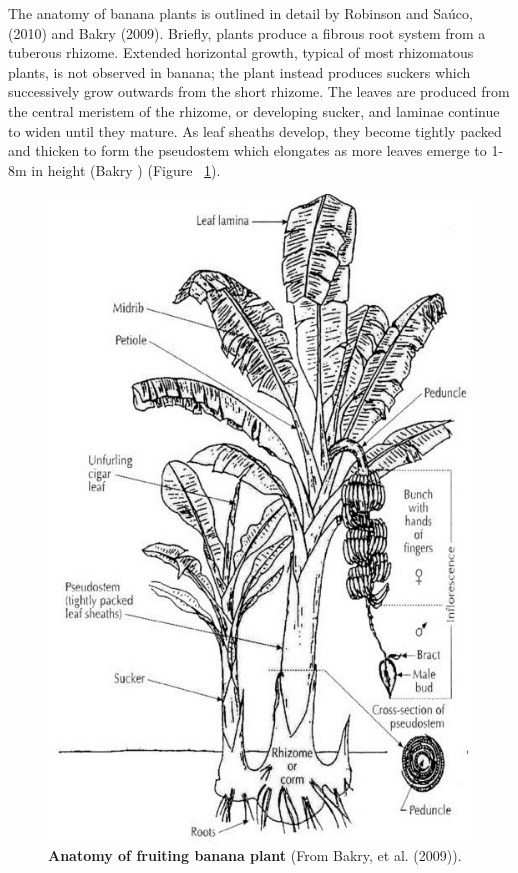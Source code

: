 The anatomy of banana plants is outlined in detail by Robinson and Saúco, (2010) and Bakry \et (2009). Briefly, plants produce a fibrous root system from a tuberous rhizome. Extended horizontal growth, typical of most rhizomatous plants, is not observed in banana; the plant instead produces suckers which successively grow outwards from the short rhizome. The leaves are produced from the central meristem of the rhizome, or developing sucker, and laminae continue to widen until they mature. As leaf sheaths develop, they become tightly packed and thicken to form the pseudostem which elongates as more leaves emerge to 1-8m in height (Bakry ) (Figure ~\ref{fig:Anatomy of fruiting banana plant}). 

\begin{figure}[hp]
    \centering
    \includegraphics[width=12cm]{Figures/Diagrammatic-representation-of-a-fruiting-banana-plant-with-suckers-in-Bakry-et-al_W640.jpg}
    \caption[Anatomy of fruiting banana plant]{\textbf{Anatomy of fruiting banana plant} (From Bakry, et al. (2009)).}
    \label{fig:Anatomy of fruiting banana plant}
\end{figure}


